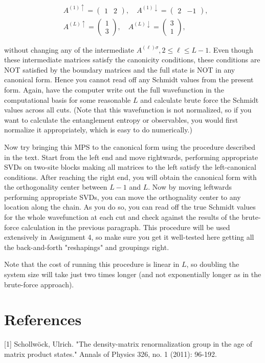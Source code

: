 \documentclass[12pt]{article}
\begin{document}
\begin{align*}
& A^{(1) \uparrow}=\left(\begin{array}{ll}
1 & 2
\end{array}\right), \quad A^{(1) \downarrow}=\left(\begin{array}{ll}
2 & -1
\end{array}\right),  \tag{30}\\
& A^{(L) \uparrow}=\left(\begin{array}{l}
1 \\
3
\end{array}\right), \quad A^{(L) \downarrow}=\left(\begin{array}{l}
3 \\
1
\end{array}\right), \tag{31}
\end{align*}


without changing any of the intermediate $A^{(\ell) \sigma}, 2 \leq \ell \leq L-1$. Even though these intermediate matrices satisfy the canonicity conditions, these conditions are NOT satisfied by the boundary matrices and the full state is NOT in any canonical form. Hence you cannot read off any Schmidt values from the present form. Again, have the computer write out the full wavefunction in the computational basis for some reasonable $L$ and calculate brute force the Schmidt values across all cuts. (Note that this wavefunction is not normalized, so if you want to calculate the entanglement entropy or observables, you would first normalize it appropriately, which is easy to do numerically.)

Now try bringing this MPS to the canonical form using the procedure described in the text. Start from the left end and move rightwards, performing appropriate SVDs on two-site blocks making all matrices to the left satisfy the left-canonical conditions. After reaching the right end, you will obtain the canonical form with the orthogonality center between $L-1$ and $L$. Now by moving leftwards performing appropriate SVDs, you can move the orthognality center to any location along the chain. As you do so, you can read off the true Schmidt values for the whole wavefunction at each cut and check against the results of the brute-force calculation in the previous paragraph. This procedure will be used extensively in Assignment 4, so make sure you get it well-tested here getting all the back-and-forth "reshapings" and groupings right.

Note that the cost of running this procedure is linear in $L$, so doubling the system size will take just two times longer (and not exponentially longer as in the brute-force approach).

\section*{References}
[1] Schollwöck, Ulrich. "The density-matrix renormalization group in the age of matrix product states." Annals of Physics 326, no. 1 (2011): 96-192.
\end{document}

